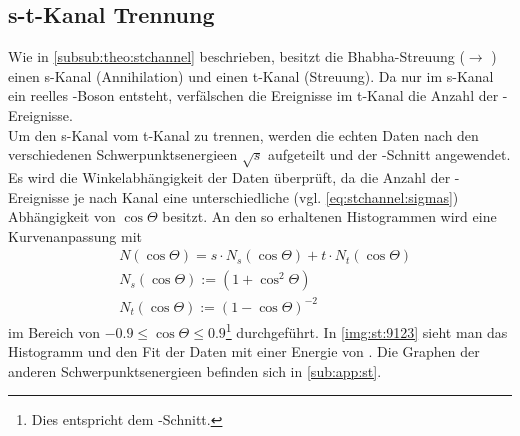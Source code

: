 \subsection{s-t-Kanal Trennung}
Wie in \autoref{subsub:theo:stchannel} beschrieben, besitzt die Bhabha-Streuung (\ee $\to$ \ee) einen s-Kanal (Annihilation)
und einen t-Kanal (Streuung). Da nur im s-Kanal ein reelles \Z -Boson entsteht, verfälschen die Ereignisse im t-Kanal die Anzahl
der \ee -Ereignisse. \\
Um den s-Kanal vom t-Kanal zu trennen, werden die echten Daten nach den verschiedenen Schwerpunktsenergieen $\sqrt{s}$ aufgeteilt und
der \ee -Schnitt angewendet. Es wird die Winkelabhängigkeit der Daten überprüft, da die Anzahl der \ee -Ereignisse
je nach Kanal eine unterschiedliche (vgl. \autoref{eq:stchannel:sigmas}) Abhängigkeit von $\cos \Theta$ besitzt. An den so erhaltenen Histogrammen wird
eine Kurvenanpassung mit
\begin{equation}
    \begin{split}
        & N(\cos \Theta) = s \cdot N_s(\cos \Theta ) + t \cdot N_t(\cos \Theta) \\
        & N_s(\cos \Theta) := \left( 1 + \cos^2 \Theta \right) \\
        & N_t (\cos \Theta) := \left( 1 - \cos \Theta \right)^{-2}
    \end{split}
\end{equation}
im Bereich von $-0.9 \leq \cos \Theta \leq 0.9$\footnote{Dies entspricht dem \ee -Schnitt.} durchgeführt. In \autoref{img:st:9123} sieht man
das Histogramm und den Fit der Daten mit einer Energie von . Die Graphen der anderen Schwerpunktsenergieen befinden sich in
\autoref{sub:app:st}.

